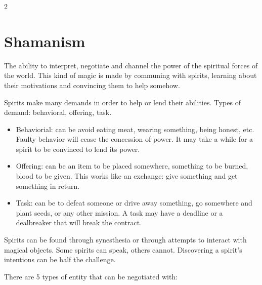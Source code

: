\begin{multicols}{2}







\section{Shamanism}

The ability to interpret, negotiate and channel the power of the spiritual forces of the world. This kind of magic is made by communing with spirits, learning about their motivations and convincing them to help somehow.

Spirits make many demands in order to help or lend their abilities. Types of demand: behavioral, offering, task. 

\begin{itemize}
    \item Behaviorial: can be avoid eating meat, wearing something, being honest, etc. Faulty behavior will cease the concession of power. It may take a while for a spirit to be convinced to lend its power.
    \item Offering: can be an item to be placed somewhere, something to be burned, blood to be given. This works like an exchange: give something and get something in return.
    \item Task: can be to defeat someone or drive away something, go somewhere and plant seeds, or any other mission. A task may have a deadline or a dealbreaker that will break the contract.
\end{itemize}

Spirits can be found through synesthesia or through attempts to interact with magical objects. Some spirits can speak, others cannot. Discovering a spirit's intentions can be half the challenge. 


There are 5 types of entity that can be negotiated with:


\end{multicols}

